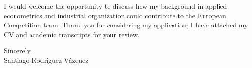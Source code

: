 \documentclass[11pt]{article}
\begin{document}
I would welcome the opportunity to discuss how my background in applied econometrics and industrial organization could contribute to the European Competition team. Thank you for considering my application; I have attached my CV and academic transcripts for your review.

\bigskip

Sincerely, \\
Santiago Rodríguez Vázquez
\end{document}
